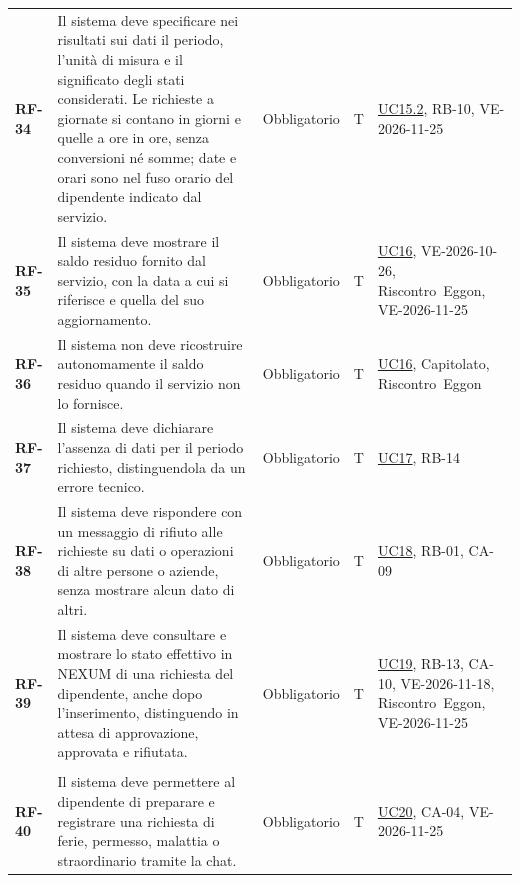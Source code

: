 \documentclass[documento]{gpt}
\begin{document}
{\begin{longtable}{@{}>{\raggedright\arraybackslash}p{1.35cm}>{\raggedright\arraybackslash}p{7.3cm}>{\raggedright\arraybackslash}p{1.9cm}>{\centering\arraybackslash}p{0.75cm}>{\raggedright\arraybackslash}p{3.1cm}@{}}
\leavevmode\hypertarget{req:RF-34}{\textbf{RF-34}} & Il sistema deve specificare nei risultati sui dati il periodo, l’unità di misura e il significato degli stati considerati. Le richieste a giornate si contano in giorni e quelle a ore in ore, senza conversioni né somme; date e orari sono nel fuso orario del dipendente indicato dal servizio. & Obbligatorio & T & \hyperref[uc:dati_criteri]{UC15.2}, \mbox{RB-10}, \mbox{VE-2026-11-25} \\
\leavevmode\hypertarget{req:RF-35}{\textbf{RF-35}} & Il sistema deve mostrare il saldo residuo fornito dal servizio, con la data a cui si riferisce e quella del suo aggiornamento. & Obbligatorio & T & \hyperref[uc:saldo]{UC16}, \mbox{VE-2026-10-26}, \mbox{Riscontro Eggon}, \mbox{VE-2026-11-25} \\
\leavevmode\hypertarget{req:RF-36}{\textbf{RF-36}} & Il sistema non deve ricostruire autonomamente il saldo residuo quando il servizio non lo fornisce. & Obbligatorio & T & \hyperref[uc:saldo]{UC16}, \mbox{Capitolato}, \mbox{Riscontro Eggon} \\
\leavevmode\hypertarget{req:RF-37}{\textbf{RF-37}} & Il sistema deve dichiarare l’assenza di dati per il periodo richiesto, distinguendola da un errore tecnico. & Obbligatorio & T & \hyperref[uc:nessun_dato]{UC17}, \mbox{RB-14} \\
\leavevmode\hypertarget{req:RF-38}{\textbf{RF-38}} & Il sistema deve rispondere con un messaggio di rifiuto alle richieste su dati o operazioni di altre persone o aziende, senza mostrare alcun dato di altri. & Obbligatorio & T & \hyperref[uc:non_aut]{UC18}, \mbox{RB-01}, \mbox{CA-09} \\
\leavevmode\hypertarget{req:RF-39}{\textbf{RF-39}} & Il sistema deve consultare e mostrare lo stato effettivo in NEXUM di una richiesta del dipendente, anche dopo l’inserimento, distinguendo in attesa di approvazione, approvata e rifiutata. & Obbligatorio & T & \hyperref[uc:stato_rich]{UC19}, \mbox{RB-13}, \mbox{CA-10}, \mbox{VE-2026-11-18}, \mbox{Riscontro Eggon}, \mbox{VE-2026-11-25} \\
\addlinespace[3pt]\multicolumn{5}{@{}l}{\textbf{\sffamily Richieste di ferie e permessi}} \\ \addlinespace[2pt]
\leavevmode\hypertarget{req:RF-40}{\textbf{RF-40}} & Il sistema deve permettere al dipendente di preparare e registrare una richiesta di ferie, permesso, malattia o straordinario tramite la chat. & Obbligatorio & T & \hyperref[uc:registra]{UC20}, \mbox{CA-04}, \mbox{VE-2026-11-25} \\

\end{longtable}}
\end{document}
